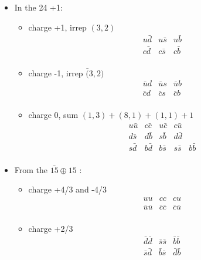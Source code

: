 \documentclass[a4paper]{article}
\begin{document}
\begin{itemize}
\item In the 24 +1:
\begin{itemize}
\item charge +1, irrep $(3,2)$ 
$$\begin{array}{ccc} 
                 u \bar d & u\bar s & u \bar b \\ 
                 c \bar d & c\bar s & c \bar b \\
                \end{array}$$
\item charge -1, irrep $\bar (3,2)$
 $$\begin{array}{ccc} 
                 \bar u  d &\bar u s &\bar u  b \\ 
                 \bar c  d &\bar c s &\bar c  b \\
                \end{array}$$
\item charge 0, sum $ (1,3) + (8,1) + (1,1) + 1 $
  $$\begin{array}{ccccc}
        u \bar u & c \bar c & u \bar c & c \bar u \\
        d\bar s & d\bar b & s\bar b & d\bar d \\
        s\bar d & b\bar d & b\bar s & s\bar s & b\bar b \\
        \end{array}$$
\end{itemize}
\item From the $\bar {15} \oplus 15$ :
\begin{itemize}
\item charge +4/3 and -4/3
$$\begin{array}{ccc} 
                 u u &  c c &  c u \\ 
                 \bar  u\bar u &  \bar  c\bar c &  \bar c\bar u \\
                \end{array}$$
\item charge +2/3
$$\begin{array}{ccc} 
                 \bar d \bar d & \bar s\bar s & \bar b \bar b \\ 
                 \bar s \bar d & \bar b\bar s & \bar d \bar b \\
                \end{array}$$
                

\end{itemize}
\end{itemize}
\end{document}
